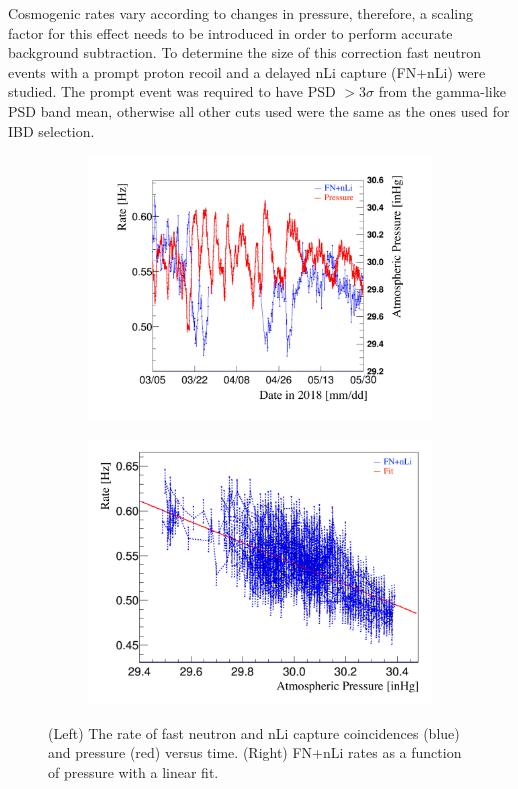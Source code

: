 Cosmogenic rates vary according to changes in pressure, therefore, a scaling factor for this effect needs to be introduced in order to perform accurate background subtraction.
To determine the size of this correction fast neutron events with a prompt proton recoil and a delayed nLi capture (FN+nLi) were studied. 
The prompt event was required to have PSD $>3\sigma$ from the gamma-like PSD band mean, otherwise all other cuts used were the same as the ones used for IBD selection.

\begin{figure}[!b]
	\begin{subfigure}{0.5\linewidth}
		\centering
		\includegraphics[width=0.95\linewidth]{tex/7-oscillation-images/FNnLi_Rate}
		\label{fig:fnnlirate}
	\end{subfigure}
	\begin{subfigure}{0.5\linewidth}
		\centering
		\includegraphics[width=0.95\linewidth]{tex/7-oscillation-images/FNnLi_RateVsPressure}
		\label{fig:fnnliratevspressure}
	\end{subfigure}
	\caption[]{(Left) The rate of fast neutron and nLi capture coincidences (blue) and pressure (red) versus time. (Right) FN+nLi rates as a function of pressure with a linear fit. \cite{Kyzylova2370:2018}}
	\label{fig:atm}
\end{figure}


